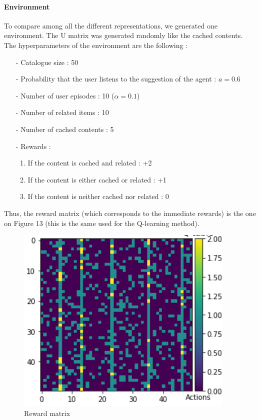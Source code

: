 \documentclass[a4paper]{article}
\begin{document}
    \paragraph{Environment} To compare among all the different representations, we generated one environment. The U matrix was generated randomly like the cached contents. The hyperparameters of the environment are the following : 
    \begin{enumerate}
        \item[-] Catalogue size : 50
        \item[-] Probability that the user listens to the suggestion of the agent : $a = 0.6$
        \item[-] Number of user episodes : 10 ($\alpha = 0.1$)
        \item[-] Number of related items : 10
        \item[-] Number of cached contents : 5
        \item[-] Rewards : \begin{enumerate}
            \item If the content is cached and related : +2
            \item If the content is either cached or related : +1
            \item If the content is neither cached nor related : 0
        \end{enumerate}
        
    \end{enumerate}
    
    Thus, the reward matrix (which corresponds to the immediate rewards) is the one on Figure 13 (this is the same used for the Q-learning method).
    
    \begin{figure}[h!]
        \centering
        \includegraphics[scale = 0.4]{img/reward_matrix.png}
        \caption{Reward matrix}
        \label{fig:my_label}
    \end{figure}
    
\end{document}
